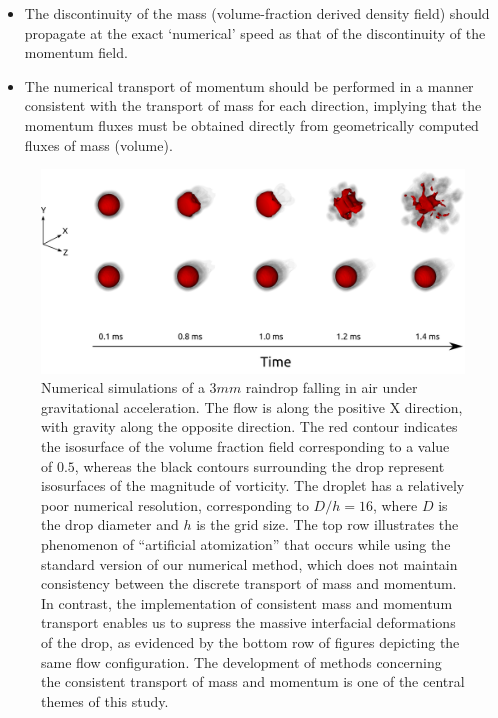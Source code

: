 \begin{itemize}
	\item The discontinuity of the mass (volume-fraction 
		derived density field) should propagate at the 
		exact `numerical' speed as that of 
		the discontinuity of the momentum field. 
	\item The numerical transport of momentum should be performed 
		in a manner consistent with the transport of mass for 
		each direction, implying that the momentum fluxes must 
		be obtained directly from geometrically 
		computed fluxes of mass (volume). 
\end{itemize}

\begin{figure}[h!]
\begin{center}
\includegraphics{plots/raindrop/raindrop_explode.png}
\end{center}
\caption{Numerical simulations of a $3 mm$ raindrop falling in air under gravitational acceleration.
	The flow is along the positive X direction, with gravity along the opposite direction. 
	The red contour indicates the isosurface of the volume fraction 
	field corresponding to a value of $0.5$, whereas the black contours 
	surrounding the drop represent isosurfaces of the magnitude of vorticity.
	The droplet has a relatively poor numerical resolution, corresponding to $D/h = 16$,
	where $D$ is the drop diameter and $h$ is the grid size.
	The top row illustrates the phenomenon of ``artificial atomization'' that occurs
	while using the standard version of our numerical method, which does not maintain
	consistency between the discrete transport of mass and momentum.
	In contrast, the implementation of consistent mass and momentum transport
	enables us to supress the massive interfacial deformations of the drop, 
	as evidenced by the bottom row of figures depicting the same flow configuration. 
	The development of methods concerning the consistent transport of mass and momentum 
	is one of the central themes of this study.
	}
	\label{explode_compare}
\end{figure}

